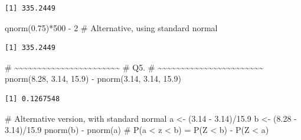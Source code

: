 \documentclass[
  letterpaper,
  DIV=11,
  numbers=noendperiod]{scrreprt}
\newenvironment{Shaded}{\begin{snugshade}}{\end{snugshade}}
\newcommand{\CommentTok}[1]{\textcolor[rgb]{0.37,0.37,0.37}{#1}}
\newcommand{\DecValTok}[1]{\textcolor[rgb]{0.68,0.00,0.00}{#1}}
\newcommand{\FloatTok}[1]{\textcolor[rgb]{0.68,0.00,0.00}{#1}}
\newcommand{\FunctionTok}[1]{\textcolor[rgb]{0.28,0.35,0.67}{#1}}
\newcommand{\NormalTok}[1]{\textcolor[rgb]{0.00,0.23,0.31}{#1}}
\newcommand{\OtherTok}[1]{\textcolor[rgb]{0.00,0.23,0.31}{#1}}
\newcommand{\SpecialCharTok}[1]{\textcolor[rgb]{0.37,0.37,0.37}{#1}}
\begin{document}
\begin{verbatim}
[1] 335.2449
\end{verbatim}

\begin{Shaded}
\begin{Highlighting}[]
\FunctionTok{qnorm}\NormalTok{(}\FloatTok{0.75}\NormalTok{)}\SpecialCharTok{*}\DecValTok{500} \SpecialCharTok{{-}} \DecValTok{2} \CommentTok{\# Alternative, using standard normal}
\end{Highlighting}
\end{Shaded}

\begin{verbatim}
[1] 335.2449
\end{verbatim}

\begin{Shaded}
\begin{Highlighting}[]
\CommentTok{\# \textasciitilde{}\textasciitilde{}\textasciitilde{}\textasciitilde{}\textasciitilde{}\textasciitilde{}\textasciitilde{}\textasciitilde{}\textasciitilde{}\textasciitilde{}\textasciitilde{}\textasciitilde{}\textasciitilde{}\textasciitilde{}\textasciitilde{}\textasciitilde{}\textasciitilde{}\textasciitilde{}\textasciitilde{}\textasciitilde{}\textasciitilde{}\textasciitilde{}\textasciitilde{}}
\CommentTok{\# Q5.}
\CommentTok{\# \textasciitilde{}\textasciitilde{}\textasciitilde{}\textasciitilde{}\textasciitilde{}\textasciitilde{}\textasciitilde{}\textasciitilde{}\textasciitilde{}\textasciitilde{}\textasciitilde{}\textasciitilde{}\textasciitilde{}\textasciitilde{}\textasciitilde{}\textasciitilde{}\textasciitilde{}\textasciitilde{}\textasciitilde{}\textasciitilde{}\textasciitilde{}\textasciitilde{}\textasciitilde{}}
\FunctionTok{pnorm}\NormalTok{(}\FloatTok{8.28}\NormalTok{, }\FloatTok{3.14}\NormalTok{, }\FloatTok{15.9}\NormalTok{) }\SpecialCharTok{{-}} \FunctionTok{pnorm}\NormalTok{(}\FloatTok{3.14}\NormalTok{, }\FloatTok{3.14}\NormalTok{, }\FloatTok{15.9}\NormalTok{)}
\end{Highlighting}
\end{Shaded}

\begin{verbatim}
[1] 0.1267548
\end{verbatim}

\begin{Shaded}
\begin{Highlighting}[]
\CommentTok{\# Alternative version, with standard normal}
\NormalTok{a }\OtherTok{\textless{}{-}}\NormalTok{ (}\FloatTok{3.14} \SpecialCharTok{{-}} \FloatTok{3.14}\NormalTok{)}\SpecialCharTok{/}\FloatTok{15.9}
\NormalTok{b }\OtherTok{\textless{}{-}}\NormalTok{ (}\FloatTok{8.28} \SpecialCharTok{{-}} \FloatTok{3.14}\NormalTok{)}\SpecialCharTok{/}\FloatTok{15.9}
\FunctionTok{pnorm}\NormalTok{(b) }\SpecialCharTok{{-}} \FunctionTok{pnorm}\NormalTok{(a) }\CommentTok{\# P(a \textless{} z \textless{} b) = P(Z \textless{} b) {-} P(Z \textless{} a)}
\end{Highlighting}
\end{Shaded}
\end{document}
